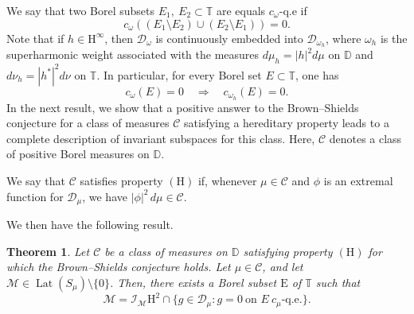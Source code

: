 \documentclass[12pt,reqno,a4paper]{amsart}
\newtheorem{theo}[prop]{Theorem}
\newcommand{\kH}{\mathrm{H^\infty  }}
\newcommand{\hH}{\mathrm{H^2 }}
\newcommand{\Ee}{\mathrm{E}}
\newcommand\TT{\mathbb{T}}
\numberwithin{equation}{section}
\begin{document}
	
	
	
	We say that two Borel  subsets $E_1, \ E_2 \subset \TT$ are equals $c_\omega$-q.e if 
	$$
	c_\omega \left ( (E_1\setminus E_2) \cup (E_2\setminus E_1)\right )= 0.
	$$
	Note that if $h \in \kH$, then $\mathcal{D}_\omega$ is continuously embedded into $\mathcal{D}_{\omega_h}$, where $\omega_h$ is the superharmonic weight associated with the measures $d\mu_h = |h|^2 d\mu$ on $\mathbb{D}$ and $d\nu_h = |h^*|^2 d\nu$ on $\mathbb{T}$. In particular, for every Borel set $E \subset \TT$, one has
	\[
	c_\omega(E) = 0 \quad \Longrightarrow \quad c_{\omega_h}(E) = 0.
	\]
	In the next result, we show that a positive answer to the Brown--Shields conjecture for a class of measures $\mathcal{C}$ satisfying a hereditary property leads to a complete description of invariant subspaces for this class. Here, $\mathcal{C}$ denotes a class of positive Borel measures on $\mathbb{D}$.
	
	We say that $\mathcal{C}$ satisfies property $(\mathrm{H})$ if, whenever $\mu \in \mathcal{C}$ and $\phi$ is an extremal function for $\mathcal{D}_\mu$, we have $|\phi|^2\, d\mu \in \mathcal{C}$.
	
	We then have the following result.
	\begin{theo}\label{equivalence}
		Let $\mathcal{C}$ be a class of measures on $\mathbb{D}$ satisfying property $(\mathrm{H})$ for which the Brown--Shields conjecture holds. Let $\mu \in \mathcal{C}$, and let $\mathcal{M}\in \operatorname{Lat}(S_\mu)\setminus\{0\} $. Then, there exists a Borel subset \(\Ee\) of \(\TT\) such that 
		\[
		\mathcal{M}
		= \mathcal{I}_{\mathcal{M}}\hH
		\cap \{ g \in \mathcal{D}_\mu : g = 0 \ \text{on } E \ \text{$c_\mu$-q.e.} \}.
		\]
	\end{theo}
	
\end{document}
